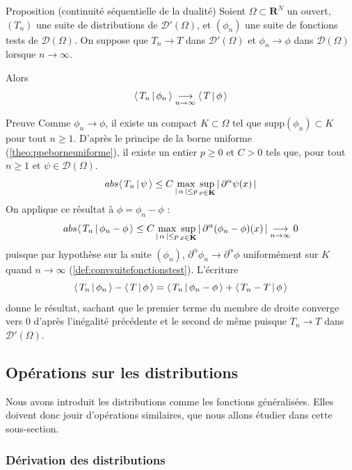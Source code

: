         \begin{omed}{Proposition (continuité séquentielle de la dualité)}
            Soient $\Omega \subset \mathbf{R}^N$ un ouvert, $(T_n)$ une suite de distributions de $\mathcal{D}'(\Omega)$, et $(\phi_n)$ une suite de fonctions tests de $\mathcal{D}(\Omega)$. On suppose que $T_n \to T$ dans $\mathcal{D}'(\Omega)$ et $\phi_n \to \phi$ dans $\mathcal{D}(\Omega)$ lorsque $n \to \infty$.

            Alors 
            \[ \left< \, T_n \, \middle| \, \phi_n \, \right> \underset{n \to \infty}{\longrightarrow} \left< \, T \, \middle| \, \phi \, \right> \]   
        \end{omed}

        \begin{demo}{Preuve}
            Comme $\phi_n \to \phi$, il existe un compact $K \subset \Omega$ tel que $\text{supp}(\phi_n) \subset K$ pour tout $n \geq 1$. D’après le principe de la borne uniforme (\ref{theo:ppeborneuniforme}), il existe un entier $p \geq 0$ et $C > 0$ tels que, pour tout $n \geq 1$ et $\psi \in \mathcal{D}(\Omega)$.
            \[ abs{\left< \, T_n \, \middle| \, \psi \, \right>} \leq C \max_{\left\lvert \, \alpha \, \right\rvert \leq p} \sup_{x \in \mathbf{K}} \left\lvert \, \partial^{\alpha} \psi(x) \, \right\rvert \]
            On applique ce résultat à $\phi = \phi_n - \phi$ :
            \[ abs{\left< \, T_n \, \middle| \, \phi_n - \phi \, \right>} \leq C \max_{\left\lvert \, \alpha \, \right\rvert \leq p} \sup_{x \in \mathbf{K}} \left\lvert \, \partial^{\alpha}(\phi_n - \phi)(x) \, \right\rvert \underset{n \to \infty}{\longrightarrow} 0 \]
            puisque par hypothèse sur la suite $(\phi_n)$, $\partial^{\alpha} \phi_n \to \partial^{\alpha} \phi$ uniformément sur $K$ quand $n \to \infty$ (\ref{def:convsuitefonctionstest}). L’écriture 
            \[ \left< \, T_n \, \middle| \, \phi_n \, \right> - \left< \, T \, \middle| \, \phi \, \right> = \left< \, T_n \, \middle| \, \phi_n - \phi \, \right> + \left< \, T_n - T \, \middle| \, \phi \, \right> \]   
            donne le résultat, sachant que le premier terme du membre de droite converge vers $0$ d’après l’inégalité précédente et le second de même puisque $T_n \to T$ dans $\mathcal{D}'(\Omega)$.
        \end{demo}

    \subsection{Opérations sur les distributions}

        Nous avons introduit les distributions comme les fonctions généralisées. Elles doivent donc jouir d’opérations similaires, que nous allons étudier dans cette sous-section.

        \subsubsection{Dérivation des distributions}

